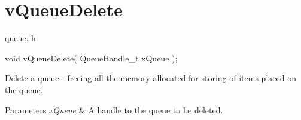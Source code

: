 \hypertarget{group__v_queue_delete}{}\section{v\+Queue\+Delete}
\label{group__v_queue_delete}
queue. h 
\begin{DoxyPre}void vQueueDelete( QueueHandle\_t xQueue );\end{DoxyPre}


Delete a queue -\/ freeing all the memory allocated for storing of items placed on the queue.


\begin{DoxyParams}{Parameters}
{\em x\+Queue} & A handle to the queue to be deleted. \\
\hline
\end{DoxyParams}
